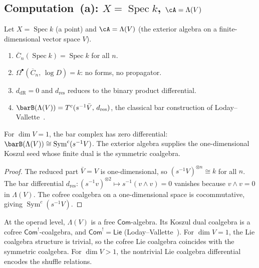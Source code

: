 \subsection*{Computation~(a): $X = \operatorname{Spec} k$,
 $\cA = \Lambda(V)$}

\begin{computation}\label{comp:fourier-point}
Let $X = \operatorname{Spec} k$ (a point) and $\cA = \Lambda(V)$
(the exterior algebra on a finite-dimensional vector space $V$).
\begin{enumerate}
\item $\overline{C}_n(\operatorname{Spec} k) = \operatorname{Spec} k$
 for all $n$.
\item $\Omega^\bullet(\overline{C}_n,\, \log D) = k$: no forms, no
 propagator.
\item $d_{\mathrm{dR}} = 0$ and $d_{\mathrm{res}}$ reduces to the
 binary product differential.
\item $\barB(\Lambda(V)) = T^c(s^{-1}\bar{V},\, d_{\mathrm{res}})$,
 the classical bar construction of
 Loday--Vallette~\cite[\S2.2]{LV12}.
\end{enumerate}
\end{computation}

\begin{proposition}[\ClaimStatusProvedHere]
\label{prop:fourier-com-lie-duality}
For $\dim V = 1$, the bar complex has zero differential:
$\barB(\Lambda(V)) \cong \operatorname{Sym}^c(s^{-1}V)$. The
exterior algebra supplies the one-dimensional Koszul seed whose
finite dual is the symmetric coalgebra.
\end{proposition}

\begin{proof}
The reduced part $\bar{V} = V$ is one-dimensional, so
$(s^{-1}V)^{\otimes n} \cong k$ for all $n$. The bar differential
$d_{\mathrm{res}}\colon (s^{-1}v)^{\otimes 2} \mapsto
s^{-1}(v \wedge v) = 0$
vanishes because $v \wedge v = 0$ in $\Lambda(V)$. The cofree
coalgebra on a one-dimensional space is cocommutative, giving
$\operatorname{Sym}^c(s^{-1}V)$.
\end{proof}

\begin{remark}\label{rem:fourier-com-lie-operad}
At the operad level, $\Lambda(V)$ is a free $\mathsf{Com}$-algebra.
Its Koszul dual coalgebra is a cofree $\mathsf{Com}^!$-coalgebra, and
$\mathsf{Com}^! = \mathsf{Lie}$
(Loday--Vallette~\cite[Theorem~7.2.2]{LV12}). For $\dim V = 1$,
the Lie coalgebra structure is trivial, so the cofree Lie coalgebra
coincides with the symmetric coalgebra. For $\dim V > 1$, the
nontrivial Lie coalgebra differential encodes the shuffle relations.
\end{remark}

